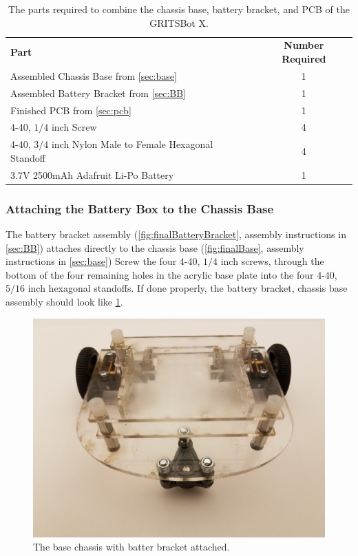  \begin{table}[h!]
 \centering
\begin{tabular}{p{3in}c}
\rowcolor[HTML]{C0C0C0} 
\textbf{Part}  & \textbf{Number Required} 		\\
Assembled Chassis Base from \cref{sec:base}		& 1	\\
\rowcolor[HTML]{C0C0C0} 
Assembled Battery Bracket from \cref{sec:BB}				& 1	\\
Finished PCB from \cref{sec:pcb}	& 1	\\
\rowcolor[HTML]{C0C0C0} 
4-40, $1/4$ inch Screw	& 4  \\
4-40, $3/4$ inch Nylon Male to Female Hexagonal Standoff	& 4\\
\rowcolor[HTML]{C0C0C0} 
3.7V 2500mAh Adafruit Li-Po Battery	& 1
\end{tabular}
\caption{The parts required to combine the chassis base, battery bracket, and PCB of the GRITSBot X. \label{tab:finishBaseParts}}
\end{table}


\subsubsection{Attaching the Battery Box to the Chassis Base}
\label{sec:BBtoCB}

The battery bracket assembly (\cref{fig:finalBatteryBracket}, assembly instructions in \cref{sec:BB}) attaches directly to the chassis base (\cref{fig:finalBase}, assembly instructions in \cref{sec:base}) Screw the four 4-40, $1/4$ inch screws,  through the bottom of the four remaining holes in the acrylic base plate into the four 4-40, $5/16$ inch hexagonal standoffs. If done properly, the battery bracket, chassis base assembly should look like \cref{fig:BBtoBC}.

\begin{figure}[h!]
\centering
\includegraphics[width=0.65\columnwidth, keepaspectratio]{./figs/20190103_140414.jpg}
\caption{The base chassis with batter bracket attached.}
\label{fig:BBtoBC}
\end{figure}

